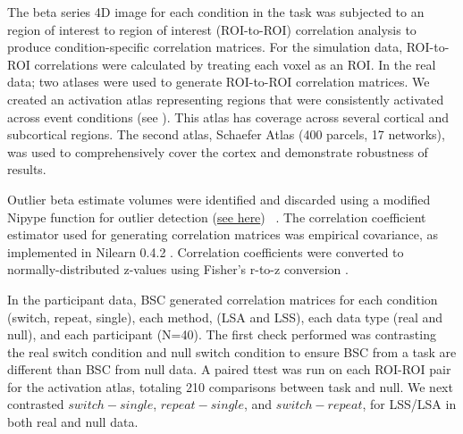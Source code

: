 \documentclass[10pt,letterpaper]{article}
\begin{document}
The beta series 4D image for each condition in the task was subjected to
an region of interest to region of interest (ROI-to-ROI) correlation analysis
to produce condition-specific correlation matrices.
For the simulation data, ROI-to-ROI correlations were calculated by
treating each voxel as an ROI.
In the real data; two atlases were used to generate ROI-to-ROI correlation matrices.
We created an activation atlas representing regions that were
consistently activated across event conditions (see ).
This atlas has coverage across several cortical and subcortical regions.
The second atlas, Schaefer Atlas (400 parcels, 17 networks)\cite{Schaefer2017}, was
used to comprehensively cover the cortex and demonstrate robustness of results.

Outlier beta estimate volumes were identified and discarded using a
modified Nipype function for outlier detection
(\href{https://github.com/HBClab/NiBetaSeries/blob/a45c0a1f/src/nibetaseries/interfaces/nilearn.py#L153}{see here}) ~\cite{Crosby1994}.
The correlation coefficient estimator used for generating correlation matrices
was empirical covariance, as implemented in Nilearn 0.4.2
\cite{Abraham2014}.
Correlation coefficients were converted to normally-distributed z-values using
Fisher's r-to-z conversion \cite{Fisher1915}.

In the participant data, BSC generated correlation matrices for each condition (switch, repeat, single),
each method, (LSA and LSS), each data type (real and null), and each participant (N=40).
The first check performed was contrasting the real switch condition and null switch condition
to ensure BSC from a task are different than BSC from null data.
A paired ttest was run on each ROI-ROI pair for the activation atlas, totaling 210 comparisons
between task and null.
We next contrasted $switch - single$, $repeat - single$, and $switch - repeat$, for LSS/LSA in both
real and null data.
\end{document}
